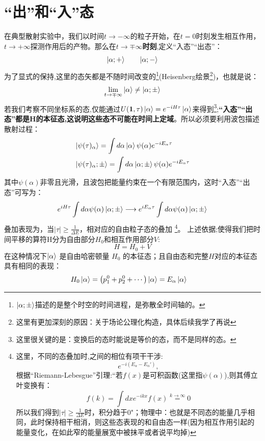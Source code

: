 \section{“出”和“入”态}

在典型散射实验中，我们以时间$t\longrightarrow-\infty$的粒子开始，在$t=0$时刻发生相互作用，$t\longrightarrow+\infty$探测作用后的产物。那么在$t\longrightarrow\mp\infty$\textbf{时刻},定义“入态”“出态”：
\[
    \ket{\alpha;+}\qquad\Ket{\alpha;-}
\]
为了显式的保持,这里的态矢都是不随时间改变的\footnote{$\ket{\alpha;\pm}$描述的是整个时空的时间进程，是弥散全时间轴的。}(Heisenberg绘景\footnote{\color{blue}这里有更加深刻的原因：关于场论公理化构造，具体后续我学了再说})，也就是说：
\[
    \lim_{t\rightarrow\mp\infty}\ket{\alpha}\neq \ket{\alpha;\pm}
\]
若我们考察不同坐标系的态,仅能通过$U(\mathbf{1},\tau)\ket{\alpha}=e^{-iH\tau}\ket{\alpha}$来得到\footnote{这里很关键的是：变换后的态时能说是等价的态，而不是同样的态。};\textbf{“入态”“出态”都是H的本征态,这说明这些态不可能在时间上定域}。所以必须要利用波包描述散射过程：
\[
    \begin{aligned}
        &\ket{\psi(\tau)_\alpha}=\int d\alpha \ket{\alpha}\psi(\alpha)e^{-iE_\alpha\tau}\\
        &\ket{\psi(\tau)_\alpha;\pm}=\int d\alpha \ket{\alpha;\pm}\psi(\alpha)e^{-iE_\alpha\tau}
    \end{aligned}
\]
其中$\psi(\alpha)$非零且光滑，且波包把能量约束在一个有限范围内，这时“入态”“出态”可写为：
\[
    e^{iH\tau}\int d\alpha \psi(\alpha)\ket{\alpha;\pm}\longrightarrow e^{iE_\alpha\tau}\int d\alpha \psi(\alpha)\ket{\alpha;\pm}
\]
叠加表现为，当$\lvert\tau\rvert\geqslant \frac{1}{\Delta E}$，相对应的自由粒子态的叠加
\footnote{这里，不同的态叠加时,之间的相位有项干干涉:
$$e^{-i(E_\alpha-E_\alpha')},$$根据“Riemann-Lebesgue”引理:“若$f(x)$是可积函数(这里指$\psi(\alpha)$),则其傅立叶变换有：$$f(k)=\int dx e^{-ikx}f(x)\overset{k\rightarrow\infty}{=}0$$所以我们得到$\lvert\tau\rvert\geqslant \frac{1}{\Delta E}$时，积分趋于0"；物理中：也就是不同态的能量几乎相同，此时保持相干相消，则这些态表现的和自由态一样(因为相互作用引起的能量变化，在如此窄的能量展宽中被抹平或者说平均掉)}\label{scattering,theory,1}。
上述依据;使得我们把时间平移的算符H分为自由部分$H_0$和相互作用部分$V$:
\begin{equation}
    H=H_0+V
\end{equation}
        \color{blue}在这种情况下$\ket{\alpha}$ 是自由哈密顿量 $H_0$ 的本征态；且自由态和完整$H$对应的本征态具有相同的表现：\normalcolor
                \begin{equation}
                        \begin{aligned}
                        H_0 \ket{\alpha}
                        &=
                        \left( p_1^0 + p_2^0 + \cdots \right)\ket{\alpha}
                        = E_\alpha \ket{\alpha}
                        \end{aligned}
                \end{equation}
